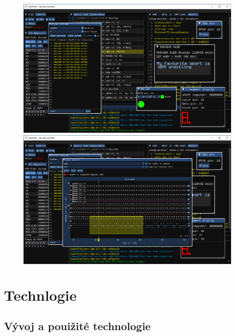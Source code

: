 \documentclass[compress]{beamer}
\begin{document}
\begin{frame}
\begin{overlayarea}{\textwidth}{\textheight}
\begin{figure}
{			}%
			\only<5>
			{%
				\includegraphics[width=.85\textwidth]{img/screenshot-06.pdf}%
			}%
			\only<6>
			{%
				\includegraphics[width=.85\textwidth]{img/screenshot-07.pdf}%
			}%
		\end{figure}
	\end{overlayarea}
\end{frame}

\section{Technlogie}

\subsection{Vývoj a pouižité technologie}
\end{document}
